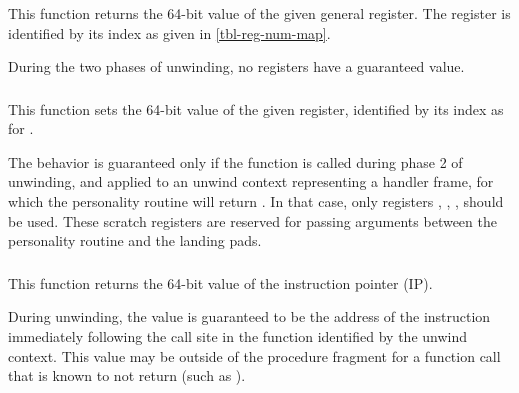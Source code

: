 This function returns the 64-bit value of the given general register.
The register is identified by its index as given in \ref{tbl-reg-num-map}.

During the two phases of unwinding, no registers have a guaranteed value.

\subsubsection{}


This function sets the 64-bit value of the given register, identified by
its index as for .

The behavior is guaranteed only if the function is called during phase 2
of unwinding, and applied to an unwind context representing a handler frame,
for which the personality routine will return .
In that case, only registers \RDI, \RSI, \RDX, \RCX should be used.
These scratch registers are reserved for passing arguments between the
personality routine and the landing pads.

\subsubsection{}


This function returns the 64-bit value of the instruction pointer (IP).

During unwinding, the value is guaranteed to be the address of the
instruction immediately following the call site in the function
identified by the unwind context. This value may be outside of the
procedure fragment for a function call that is known to not return
(such as ).

